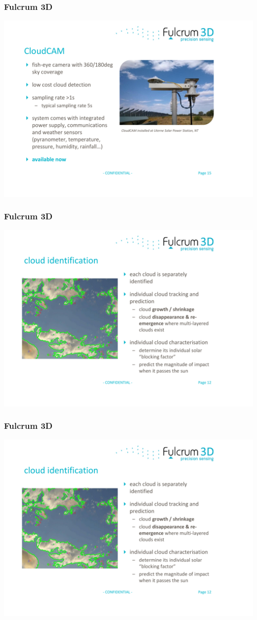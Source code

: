 \documentclass{beamer}
\begin{document}

\begin{frame}\frametitle{Fulcrum 3D}
\includegraphics[width=\hsize]{Fulcrum-s1.pdf}
\end{frame}
\begin{frame}\frametitle{Fulcrum 3D}
\includegraphics[width=\hsize]{Fulcrum-s2.pdf}
\end{frame}
\begin{frame}\frametitle{Fulcrum 3D}
\includegraphics[width=\hsize]{Fulcrum-s3.pdf}
\end{frame}
\end{document}
